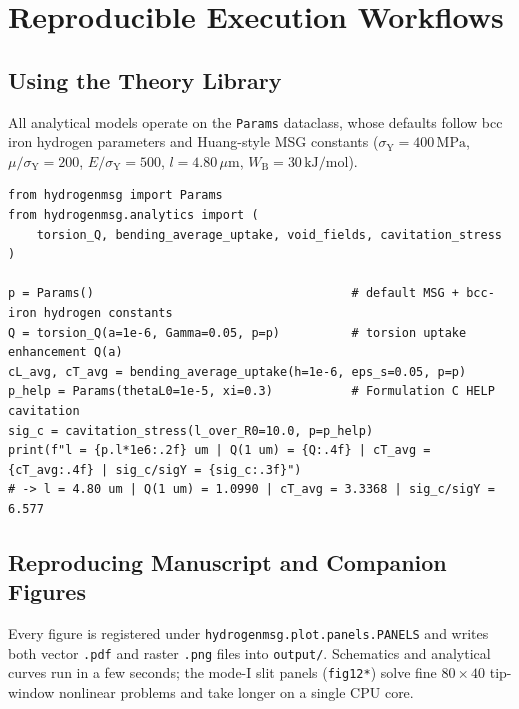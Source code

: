 \documentclass[11pt]{article}
\begin{document}
\section{Reproducible Execution Workflows}

\subsection{Using the Theory Library}

All analytical models operate on the \texttt{Params} dataclass, whose defaults follow bcc iron hydrogen parameters and Huang-style MSG constants ($\sigma_{\mathrm{Y}}=400\,\mathrm{MPa}$, $\mu/\sigma_{\mathrm{Y}}=200$, $E/\sigma_{\mathrm{Y}}=500$, $l=4.80\,\mu\mathrm{m}$, $W_{\mathrm{B}}=30\,\mathrm{kJ/mol}$).

\noindent\begin{minipage}{\textwidth}
\begin{lstlisting}[style=runpython]
from hydrogenmsg import Params
from hydrogenmsg.analytics import (
    torsion_Q, bending_average_uptake, void_fields, cavitation_stress
)

p = Params()                                    # default MSG + bcc-iron hydrogen constants
Q = torsion_Q(a=1e-6, Gamma=0.05, p=p)          # torsion uptake enhancement Q(a)
cL_avg, cT_avg = bending_average_uptake(h=1e-6, eps_s=0.05, p=p)
p_help = Params(thetaL0=1e-5, xi=0.3)           # Formulation C HELP cavitation
sig_c = cavitation_stress(l_over_R0=10.0, p=p_help)
print(f"l = {p.l*1e6:.2f} um | Q(1 um) = {Q:.4f} | cT_avg = {cT_avg:.4f} | sig_c/sigY = {sig_c:.3f}")
# -> l = 4.80 um | Q(1 um) = 1.0990 | cT_avg = 3.3368 | sig_c/sigY = 6.577
\end{lstlisting}
\end{minipage}

\subsection{Reproducing Manuscript and Companion Figures}

Every figure is registered under \texttt{hydrogenmsg.plot.panels.PANELS} and writes both vector \texttt{.pdf} and raster \texttt{.png} files into \texttt{output/}.
%
Schematics and analytical curves run in a few seconds; the mode-I slit panels (\texttt{fig12*}) solve fine $80\times 40$ tip-window nonlinear problems and take longer on a single CPU core.
\end{document}
